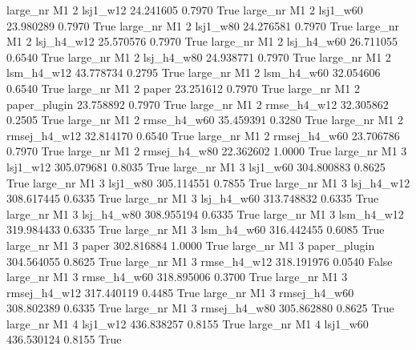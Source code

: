   large_nr       M1                 2     lsj1_w12   24.241605      0.7970    True
  large_nr       M1                 2     lsj1_w60   23.980289      0.7970    True
  large_nr       M1                 2     lsj1_w80   24.276581      0.7970    True
  large_nr       M1                 2   lsj_h4_w12   25.570576      0.7970    True
  large_nr       M1                 2   lsj_h4_w60   26.711055      0.6540    True
  large_nr       M1                 2   lsj_h4_w80   24.938771      0.7970    True
  large_nr       M1                 2   lsm_h4_w12   43.778734      0.2795    True
  large_nr       M1                 2   lsm_h4_w60   32.054606      0.6540    True
  large_nr       M1                 2        paper   23.251612      0.7970    True
  large_nr       M1                 2 paper_plugin   23.758892      0.7970    True
  large_nr       M1                 2  rmse_h4_w12   32.305862      0.2505    True
  large_nr       M1                 2  rmse_h4_w60   35.459391      0.3280    True
  large_nr       M1                 2 rmsej_h4_w12   32.814170      0.6540    True
  large_nr       M1                 2 rmsej_h4_w60   23.706786      0.7970    True
  large_nr       M1                 2 rmsej_h4_w80   22.362602      1.0000    True
  large_nr       M1                 3     lsj1_w12  305.079681      0.8035    True
  large_nr       M1                 3     lsj1_w60  304.800883      0.8625    True
  large_nr       M1                 3     lsj1_w80  305.114551      0.7855    True
  large_nr       M1                 3   lsj_h4_w12  308.617445      0.6335    True
  large_nr       M1                 3   lsj_h4_w60  313.748832      0.6335    True
  large_nr       M1                 3   lsj_h4_w80  308.955194      0.6335    True
  large_nr       M1                 3   lsm_h4_w12  319.984433      0.6335    True
  large_nr       M1                 3   lsm_h4_w60  316.442455      0.6085    True
  large_nr       M1                 3        paper  302.816884      1.0000    True
  large_nr       M1                 3 paper_plugin  304.564055      0.8625    True
  large_nr       M1                 3  rmse_h4_w12  318.191976      0.0540   False
  large_nr       M1                 3  rmse_h4_w60  318.895006      0.3700    True
  large_nr       M1                 3 rmsej_h4_w12  317.440119      0.4485    True
  large_nr       M1                 3 rmsej_h4_w60  308.802389      0.6335    True
  large_nr       M1                 3 rmsej_h4_w80  305.862880      0.8625    True
  large_nr       M1                 4     lsj1_w12  436.838257      0.8155    True
  large_nr       M1                 4     lsj1_w60  436.530124      0.8155    True
